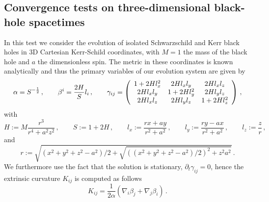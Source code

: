 \subsection{Convergence tests on three-dimensional black-hole spacetimes}
\label{sec:convergence-bh3d}

In this test we consider the evolution of isolated Schwarzschild and Kerr
black holes in 3D Cartesian Kerr-Schild coordinates, with $M=1$ the mass
of the black hole and $a$ the dimensionless spin. The metric in these
coordinates is known analytically and thus the primary variables of our
evolution system are given by
%
\begin{equation}
  \alpha = S^{-\frac{1}{2}}\,, \qquad
	\beta^i = \frac{2 H}{S} l_i\,, \qquad
	\gamma_{ij} = \left( \begin{array}{ccc}
	 1 + 2 H l_x^2 & 2 H l_x l_y & 2 H l_x l_z \\
	 2 H l_x l_y & 1 + 2 H l_y^2  & 2 H l_y l_z \\
	 2 H l_x l_z & 2 H l_y l_z & 1 + 2 H l_z^2
	\end{array} \right)\,,
	\label{eqn.kerr.metric}
\end{equation}
%
with
%
\begin{equation*}
	 H := M \frac{r^3}{r^4 + a^2 z^2}\,, \qquad
	 S := 1 + 2 H\,, \qquad
	 l_x := \frac{r x + a y}{r^2 + a^2}\,, \qquad
	 l_y := \frac{r y - a x}{r^2 + a^2}\,, \qquad
	 l_z := \frac{z}{r}\,,
\end{equation*}
%
and
%
\begin{equation*}
r := \sqrt{ (x^2 + y^2 + z^2 - a^2)/2 + \sqrt{((x^2 + y^2 + z^2 -
    a^2)/2)^2 + z^2 a^2} }\,.
\end{equation*}
%
We furthermore use the fact that the solution is stationary, \ie
$\partial_t \gamma_{ij}=0$, hence the extrinsic curvature $K_{ij}$ is
computed as follows \cite{Rezzolla_book:2013}
%
\begin{equation}
K_{ij} = \frac{1}{2\alpha} \left( \nabla_i \beta_j + \nabla_j \beta_i
\right)\,.
\end{equation}
%

